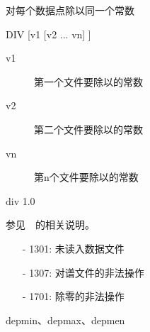 \label{cmd:div}

对每个数据点除以同一个常数

\begin{SACSTX}
DIV [v1 [v2 ... vn] ]
\end{SACSTX}

\begin{description}
\item [v1] 第一个文件要除以的常数
\item [v2] 第二个文件要除以的常数
\item [vn] 第n个文件要除以的常数 
\end{description}

\begin{SACDFT}
div 1.0
\end{SACDFT}

参见~~的相关说明。

\begin{itemize}
\item[-]1301: 未读入数据文件
\item[-]1307: 对谱文件的非法操作
\item[-]1701: 除零的非法操作
\end{itemize}

depmin、depmax、depmen
